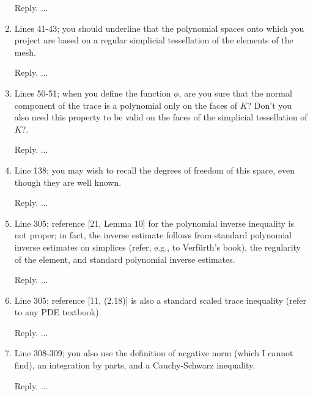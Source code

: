 \documentclass[10pt]{amsart}
\theoremstyle{definition}
\theoremstyle{remark}
\begin{document}
\begin{enumerate}[1.]
\smallskip \noindent \textcolor[rgb]{1.00,0.00,0.00}{Reply.}
...

\medskip

\item \textsf{Lines 41-43; you should underline that the polynomial spaces onto which you project are based on a regular simplicial tessellation of the elements of the mesh.}

\smallskip \noindent \textcolor[rgb]{1.00,0.00,0.00}{Reply.}
...

\medskip

\item \textsf{Lines 50-51; when you define the function $\phi$, are you sure that the normal component of the trace is a polynomial only on the faces of $K$? Don't you also need this property to be valid on the faces of the simplicial tessellation of $K$?.}

\smallskip \noindent \textcolor[rgb]{1.00,0.00,0.00}{Reply.}
...

\medskip

\item \textsf{Line 138; you may wish to recall the degrees of freedom of this space, even though they are well known.}

\smallskip \noindent \textcolor[rgb]{1.00,0.00,0.00}{Reply.}
...

\medskip

\item \textsf{Line 305; reference [21, Lemma 10] for the polynomial inverse inequality is not proper; in fact, the inverse estimate follows from standard polynomial inverse estimates on simplices (refer, e.g., to Verf{\"u}rth's book), the regularity of the element, and standard polynomial inverse estimates.}

\smallskip \noindent \textcolor[rgb]{1.00,0.00,0.00}{Reply.}
...

\medskip

\item \textsf{Line 305; reference [11, (2.18)] is also a standard scaled trace inequality (refer to any PDE textbook).}

\smallskip \noindent \textcolor[rgb]{1.00,0.00,0.00}{Reply.}
...

\medskip

\item \textsf{Line 308-309; you also use the definition of negative norm (which I cannot find), an integration by parts, and a Cauchy-Schwarz inequality.}

\smallskip \noindent \textcolor[rgb]{1.00,0.00,0.00}{Reply.}
...


\end{enumerate}
\end{document}
